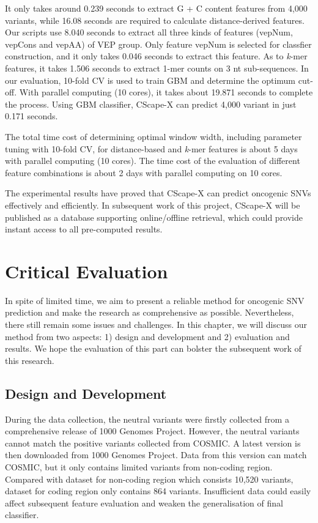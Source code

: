 \documentclass[a4paper,nohyper,nobib,openany,justified]{tufte-book}
\begin{document}
\begin{fullwidth}
It only takes around 0.239 seconds to extract G + C content features from 4,000 variants, while 16.08 seconds are required to calculate distance-derived features. Our scripts use 8.040 seconds to extract all three kinds of features (vepNum, vepCons and vepAA) of VEP group. Only feature vepNum is selected for classfier construction, and it only takes 0.046 seconds to extract this feature. As to \emph{k}-mer features, it takes 1.506 seconds to extract 1-mer counts on 3 nt sub-sequences. In our evaluation, 10-fold CV is used to train GBM and determine the optimum cut-off. With parallel computing (10 cores), it takes about 19.871 seconds to complete the process. Using GBM classifier, CScape-X can predict 4,000 variant in just 0.171 seconds.

The total time cost of determining optimal window width, including parameter tuning with 10-fold CV, for distance-based and \emph{k}-mer features is about 5 days with parallel computing (10 cores). The time cost of the evaluation of different feature combinations is about 2 days with parallel computing on 10 cores.

The experimental results have proved that CScape-X can predict oncogenic SNVs effectively and efficiently. In subsequent work of this project, CScape-X will be published as a database supporting online/offline retrieval, which could provide instant access to all pre-computed results.

\clearpage
\chapter{Critical Evaluation}

In spite of limited time, we aim to present a reliable method for oncogenic SNV prediction and make the research as comprehensive as possible. Nevertheless, there still remain some issues and challenges. In this chapter, we will discuss our method from two aspects: 1) design and development and 2) evaluation and results. We hope the evaluation of this part can bolster the subsequent work of this research.

\section{Design and Development}

During the data collection, the neutral variants were firstly collected from a comprehensive release of 1000 Genomes Project. However, the neutral variants cannot match the positive variants collected from COSMIC. A latest version is then downloaded from 1000 Genomes Project. Data from this version can match COSMIC, but it only contains limited variants from non-coding region. Compared with dataset for non-coding region which consists 10,520 variants, dataset for coding region only contains 864 variants. Insufficient data could easily affect subsequent feature evaluation and weaken the generalisation of final classifier.


\end{fullwidth}
\end{document}
